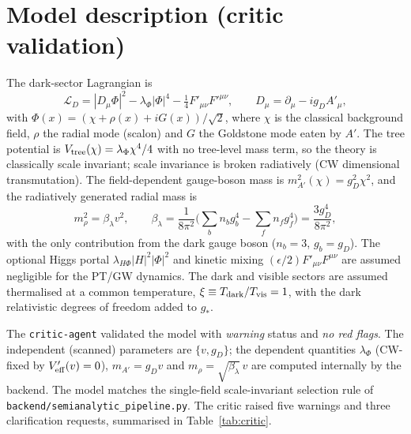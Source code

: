 \documentclass[11pt]{article}
\newcommand{\gD}{g_D}
\newcommand{\mAp}{m_{A'}}
\newcommand{\mrho}{m_\rho}
\begin{document}
\section{Model description (critic validation)}
\label{sec:model}
The dark-sector Lagrangian is
\begin{equation}
\mathcal{L}_D = |D_\mu\Phi|^2 - \lambda_\Phi|\Phi|^4
- \tfrac14 F'_{\mu\nu}F'^{\mu\nu},\qquad
D_\mu = \partial_\mu - i\gD A'_\mu ,
\end{equation}
with $\Phi(x)=(\chi+\rho(x)+iG(x))/\sqrt2$, where $\chi$ is the classical
background field, $\rho$ the radial mode (scalon) and $G$ the Goldstone mode
eaten by $A'$. The tree potential is $V_{\rm tree}(\chi)=\lambda_\Phi\chi^4/4$
with no tree-level mass term, so the theory is classically scale invariant;
scale invariance is broken radiatively (CW dimensional transmutation). The
field-dependent gauge-boson mass is $\mAp^2(\chi)=\gD^2\chi^2$, and the
radiatively generated radial mass is
\begin{equation}
\mrho^2=\beta_\lambda v^2,\qquad
\beta_\lambda=\frac{1}{8\pi^2}\Big(\sum_b n_b g_b^4-\sum_f n_f g_f^4\Big)
=\frac{3\gD^4}{8\pi^2},
\end{equation}
with the only contribution from the dark gauge boson ($n_b=3$, $g_b=\gD$).
The optional Higgs portal $\lambda_{H\Phi}|H|^2|\Phi|^2$ and kinetic mixing
$(\epsilon/2)F'_{\mu\nu}F^{\mu\nu}$ are assumed negligible for the PT/GW
dynamics. The dark and visible sectors are assumed thermalised at a common
temperature, $\xi\equiv T_{\rm dark}/T_{\rm vis}=1$, with the dark relativistic
degrees of freedom added to $g_*$.

The \texttt{critic-agent} validated the model with \emph{warning} status and
\emph{no red flags}. The independent (scanned) parameters are $\{v,\gD\}$; the
dependent quantities $\lambda_\Phi$ (CW-fixed by $V_{\rm eff}'(v)=0$),
$\mAp=\gD v$ and $\mrho=\sqrt{\beta_\lambda}\,v$ are computed internally by the
backend. The model matches the single-field scale-invariant selection rule of
\texttt{backend/semianalytic\_pipeline.py}. The critic raised five warnings and
three clarification requests, summarised in Table~\ref{tab:critic}.
\end{document}
